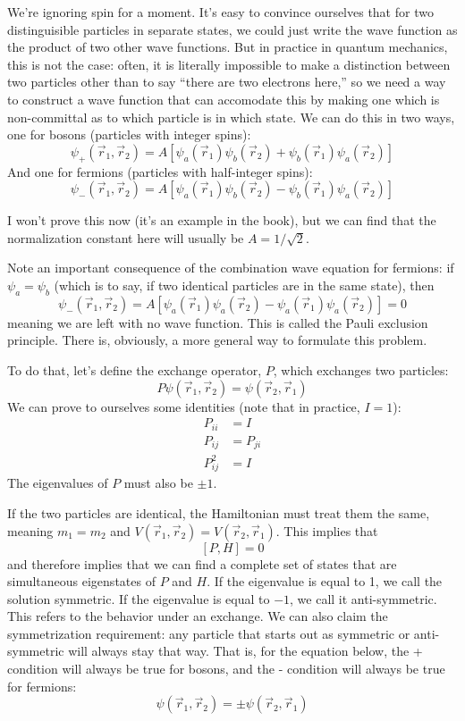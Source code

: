 \documentclass[a4paper]{article}
\begin{document}
We're ignoring spin for a moment. It's easy to convince ourselves that for
two distinguisible particles in separate states, we could just write the
wave function as the product of two other wave functions. But in practice in
quantum mechanics, this is not the case: often, it is literally impossible to
make a distinction between two particles other than to say ``there are two
electrons here,'' so we need a way to construct a wave function that can
accomodate this by making one which is non-committal as to which particle is
in which state. We can do this in two ways, one for bosons (particles with
integer spins):
\[ \psi_+(\vec{r}_1,\vec{r}_2) = A[\psi_a(\vec{r}_1)\psi_b(\vec{r}_2) +
\psi_b(\vec{r}_1)\psi_a(\vec{r}_2)] \]
And one for fermions (particles with half-integer spins):
\[ \psi_-(\vec{r}_1,\vec{r}_2) = A[\psi_a(\vec{r}_1)\psi_b(\vec{r}_2) -
\psi_b(\vec{r}_1)\psi_a(\vec{r}_2)] \]

I won't prove this now (it's an example in the book), but we can find that the
normalization constant here will usually be $A=1/\sqrt{2}$.

Note an important consequence of the combination wave equation for fermions:
if $\psi_a = \psi_b$ (which is to say, if two identical particles are in the
same state), then
\[ \psi_-(\vec{r}_1,\vec{r}_2) = A[\psi_a(\vec{r}_1)\psi_a(\vec{r}_2) -
\psi_a(\vec{r}_1)\psi_a(\vec{r}_2)] = 0 \]
meaning we are left with no wave function. This is called the Pauli exclusion
principle. There is, obviously, a more general way to formulate this problem.

To do that, let's define the exchange operator, $P$, which exchanges two
particles:
\[ P\psi(\vec{r}_1,\vec{r}_2) = \psi(\vec{r}_2,\vec{r}_1) \]
We can prove to ourselves some identities (note that in practice, $I=1$):
\begin{align*}
	P_{ii}&=I\\
	P_{ij}&=P_{ji}\\
	P_{ij}^2&=I
\end{align*}
The eigenvalues of $P$ must also be $\pm1$.

If the two particles are identical, the Hamiltonian must treat them the same,
meaning $m_1=m_2$ and $V(\vec{r}_1,\vec{r}_2)=V(\vec{r}_2,\vec{r}_1)$. This
implies that
\[ [P,H] = 0\]
and therefore implies that we can find a complete set of states that are
simultaneous eigenstates of $P$ and $H$.
If the eigenvalue is equal to 1, we call the solution symmetric. If the
eigenvalue is equal to $-1$, we call it anti-symmetric. This refers to the
behavior under an exchange.
We can also claim the symmetrization requirement: any particle that starts out
as symmetric or anti-symmetric will always stay that way. That is, for the
equation below, the + condition will always be true for bosons, and the -
condition will always be true for fermions:
\[ \psi(\vec{r}_1,\vec{r}_2) = \pm \psi(\vec{r}_2,\vec{r}_1) \]
\end{document}
